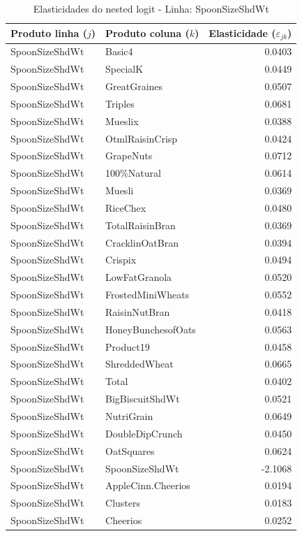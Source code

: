 \begingroup
\begin{table}[H]
\centering
\caption{Elasticidades do nested logit - Linha: SpoonSizeShdWt}
\label{tab:elas-nested-spoonsizeshdwt}
\small
\begin{tabular}{llr}
\toprule
Produto linha ($j$) & Produto coluna ($k$) & Elasticidade ($\varepsilon_{jk}$) \\
\midrule
SpoonSizeShdWt & Basic4 & 0.0403 \\
SpoonSizeShdWt & SpecialK & 0.0449 \\
SpoonSizeShdWt & GreatGraines & 0.0507 \\
SpoonSizeShdWt & Triples & 0.0681 \\
SpoonSizeShdWt & Mueslix & 0.0388 \\
SpoonSizeShdWt & OtmlRaisinCrisp & 0.0424 \\
SpoonSizeShdWt & GrapeNuts & 0.0712 \\
SpoonSizeShdWt & 100\%Natural & 0.0614 \\
SpoonSizeShdWt & Muesli & 0.0369 \\
SpoonSizeShdWt & RiceChex & 0.0480 \\
SpoonSizeShdWt & TotalRaisinBran & 0.0369 \\
SpoonSizeShdWt & CracklinOatBran & 0.0394 \\
SpoonSizeShdWt & Crispix & 0.0494 \\
SpoonSizeShdWt & LowFatGranola & 0.0520 \\
SpoonSizeShdWt & FrostedMiniWheats & 0.0552 \\
SpoonSizeShdWt & RaisinNutBran & 0.0418 \\
SpoonSizeShdWt & HoneyBunchesofOats & 0.0563 \\
SpoonSizeShdWt & Product19 & 0.0458 \\
SpoonSizeShdWt & ShreddedWheat & 0.0665 \\
SpoonSizeShdWt & Total & 0.0402 \\
SpoonSizeShdWt & BigBiscuitShdWt & 0.0521 \\
SpoonSizeShdWt & NutriGrain & 0.0649 \\
SpoonSizeShdWt & DoubleDipCrunch & 0.0450 \\
SpoonSizeShdWt & OatSquares & 0.0624 \\
SpoonSizeShdWt & SpoonSizeShdWt & -2.1068 \\
SpoonSizeShdWt & AppleCinn.Cheerios & 0.0194 \\
SpoonSizeShdWt & Clusters & 0.0183 \\
SpoonSizeShdWt & Cheerios & 0.0252 \\

\end{tabular}
\end{table}

